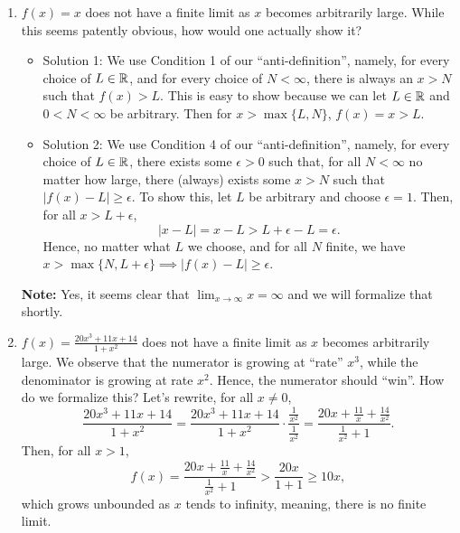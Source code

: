 \begin{enumerate}
\renewcommand{\labelenumi}{(\alph{enumi})}
\setlength{\itemsep}{.3cm}
    \item $f(x) = x$ does not have a finite limit as $x$ becomes arbitrarily large. While this seems patently obvious, how would one actually show it? 
    
    \begin{itemize} 
    
    \item Solution 1: We use Condition 1 of our ``anti-definition'', namely, for every choice of $L \in \mathbb R$, and for every choice of $N < \infty$, there is always an $ x>N$ such that $f(x) > L$. This is easy to show because we can let $L\in \mathbb R$ and $0< N < \infty$ be arbitrary. Then for $x > \max\{L, N\}$, $f(x) = x >L$. 
    
    \item Solution 2: We use Condition 4 of our  ``anti-definition'', namely,  for every choice of $L \in \mathbb R$, there exists some $\epsilon>0$ such that, for all $N < \infty$ no matter how large, there (always) exists some $x > N$ such that $|f(x)-L| \ge \epsilon$. To show this, let $L$ be arbitrary and choose $\epsilon = 1$. Then, for all $x > L + \epsilon $,
    $$  |x - L| = x - L > L + \epsilon - L =  \epsilon. $$
   Hence, no matter what $L$ we choose, and for all $N$ finite, we have $x > \max\{N, L+ \epsilon\} \implies |f(x) - L| \ge \epsilon$. \\

    \end{itemize}

    
    \textbf{Note:} Yes, it seems clear that $\lim_{x \to \infty} x = \infty$ and we will formalize that shortly. 


    \item  $f(x) = \frac{20 x^3 + 11 x + 14}{1 + x^2}$ does not have a finite limit as $x$ becomes arbitrarily large. We observe that the numerator is growing at ``rate'' $x^3$, while the denominator is growing at rate $x^2$. Hence, the numerator should ``win''. How do we formalize this? Let's rewrite, for all $x \ne 0$, 
    $$\frac{20 x^3 + 11 x + 14}{1 + x^2} = \frac{20 x^3 + 11 x + 14}{1 + x^2} \cdot \frac{\frac{1}{x^2}}{\frac{1}{x^2}} =\frac{20 x + \frac{11}{x} + \frac{14}{x^2}}{\frac{1}{x^2} + 1} .$$
    Then, for all $x> 1$,
    $$f(x) = \frac{20 x + \frac{11}{x} + \frac{14}{x^2}}{\frac{1}{x^2} + 1} > \frac{20 x }{1 + 1} \ge 10 x ,$$
    which grows unbounded as $x$ tends to infinity, meaning, there is no finite limit.


\end{enumerate}

